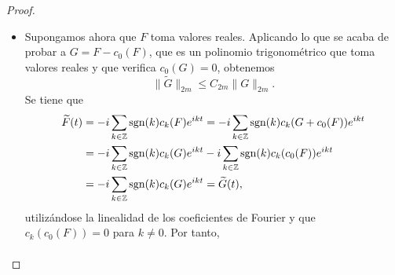 \documentclass[a4paper, 12pt, oneside]{book}
\begin{document}
\begin{proof}
\begin{itemize}
\begin{align*}
            &=\Bigl( \frac{1}{2\pi}\integral{-\pi}{\pi}{F(t)^{2k\frac{2m}{2k}}}\Bigr)^{\frac{2k}{2m}}\Bigl( \frac{1}{2\pi}\integral{-\pi}{\pi}{\widetilde{F}(t)^{{2m-2k}\frac{2m}{2m-2k}}}\Bigr)^{\frac{2m-2k}{2m}} \\
            &= \|F\|_{2m}^{2k}\|\widetilde{F}\|_{2m}^{2m-2k}.
        \end{align*}
        Si $k = m$, sigue siendo cierta la desigualdad $\|F^{2k}\widetilde{F}^{2m-2k}\|_1 \leq \|F\|_{2m}^{2k}\|\widetilde{F}\|_{2m}^{2m-2k}$.  Tenemos entonces
        \[\|\widetilde{F}\|_{2m}^{2m} \leq \sum_{k=1}^m \binom{2m}{2k}\|F\|_{2m}^{2k}\|\widetilde{F}\|_{2m}^{2m-2k}.\]
        Dividiendo por $\|\widetilde{F}\|_{2m}^{2m}$ (si fuese $\widetilde{F} = 0$ no hay nada que probar),
        \[1 \leq \sum_{k=1}^m \binom{2m}{2k}\Bigl(\frac{\|F\|_{2m}}{\|\widetilde{F}\|_{2m}}\Bigr)^{2k}.\]
        Sea $R = \frac{\|F\|_{2m}}{\|\widetilde{F}\|_{2m}}$ y consideremos la función $\varphi \colon [0,\infty)\to\R$ dada por
        \[\varphi(t) = \sum_{k=1}^m \binom{2m}{2k}t^{2k}.\]
        La última desigualdad nos dice que $\varphi(R) \geq 1$. También tenemos que $\varphi$ es continua, estrictamente creciente y tal que
        \[\lim_{t \to \infty} \varphi(t) = \infty, \qquad \varphi(0) = 0.\]
        Por el teorema de los valores intermedios, existe $C > 0$ (que solo depende de $m$) tal que $\varphi(C) = 1$. Como $\varphi(R) \geq 1$ y $\varphi$ es estrictamente creciente, tiene que ser $R \geq C$, luego
        \[\|F\|_{2m} \geq C\|\widetilde{F}\|_{2m}.\]
        Llamando $C_{2m} = \frac{1}{C}$, obtenemos que
        \[\|\widetilde{F}\|_{2m} \leq C_{2m}\|F\|_{2m}.\]
        \item Supongamos ahora que $F$ toma valores reales. Aplicando lo que se acaba de probar a $G = F-c_0(F)$, que es un polinomio trigonométrico que toma valores reales y que verifica $c_0(G)=0$, obtenemos
        \[\|\widetilde{G}\|_{2m}\leq C_{2m}\|G\|_{2m}.\]
        Se tiene que
        \begin{align*}
            \widetilde{F}(t) &= -i\sum_{k\in\mathbb Z}\textup{sgn}(k)c_k(F)e^{ikt} = -i\sum_{k\in\mathbb Z}\textup{sgn}(k)c_k(G+c_0(F))e^{ikt} \\
            &= -i\sum_{k\in\mathbb Z}\textup{sgn}(k)c_k(G)e^{ikt}-i\sum_{k\in\mathbb Z}\textup{sgn}(k)c_k(c_0(F))e^{ikt} \\
            &= -i\sum_{k\in\mathbb Z}\textup{sgn}(k)c_k(G)e^{ikt} = \widetilde{G}(t),
        \end{align*}
        utilizándose la linealidad de los coeficientes de Fourier y que $c_k(c_0(F)) = 0$ para $k\neq 0$. Por tanto,
        \begin{align*}

\end{align*}
\end{itemize}
\end{proof}
\end{document}
